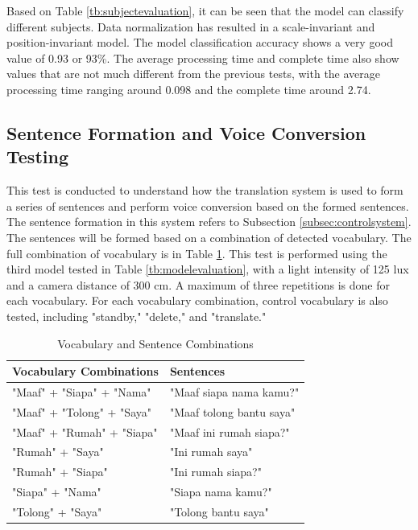 Based on Table \ref{tb:subjectevaluation}, it can be seen that the model can classify different subjects. Data normalization has resulted in a scale-invariant and position-invariant model. The model classification accuracy shows a very good value of 0.93 or 93\%. The average processing time and complete time also show values that are not much different from the previous tests, with the average processing time ranging around 0.098 and the complete time around 2.74.

\subsection{Sentence Formation and Voice Conversion Testing}
\label{sec:sentenceanalysis}

This test is conducted to understand how the translation system is used to form a series of sentences and perform voice conversion based on the formed sentences. The sentence formation in this system refers to Subsection \ref{subsec:controlsystem}. The sentences will be formed based on a combination of detected vocabulary. The full combination of vocabulary is in Table \ref{tb:vocabularycombination}. This test is performed using the third model tested in Table \ref{tb:modelevaluation}, with a light intensity of 125 lux and a camera distance of 300 cm. A maximum of three repetitions is done for each vocabulary. For each vocabulary combination, control vocabulary is also tested, including "standby," "delete," and "translate."

\begin{table}[H]
  \caption{Vocabulary and Sentence Combinations}
  \label{tb:vocabularycombination}
  \centering
  \begin{tabular}{ll}
    \hline
    \textbf{Vocabulary Combinations} & \textbf{Sentences} \\
    \hline
    "Maaf" + "Siapa" + "Nama" & "Maaf siapa nama kamu?" \\
    "Maaf" + "Tolong" + "Saya" & "Maaf tolong bantu saya" \\
    "Maaf" + "Rumah" + "Siapa" & "Maaf ini rumah siapa?" \\
    "Rumah" + "Saya" & "Ini rumah saya" \\
    "Rumah" + "Siapa" & "Ini rumah siapa?" \\
    "Siapa" + "Nama" & "Siapa nama kamu?" \\
    "Tolong" + "Saya" & "Tolong bantu saya" \\
    \hline
  \end{tabular}
\end{table}

